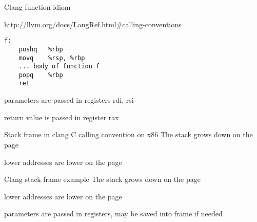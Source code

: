 \documentclass[landscape]{beamer}
\begin{document}
\begin{frame}[fragile]{Clang function idiom}

\url{http://llvm.org/docs/LangRef.html#calling-conventions}

\begin{verbatim}
f:
	pushq	%rbp
	movq	%rsp, %rbp
    ... body of function f
	popq	%rbp
	ret
\end{verbatim}

parameters are passed in registers rdi, rsi

return value is passed in register rax
\end{frame}


\begin{frame}[fragile]{Stack frame in clang C calling convention on x86}
The stack grows down on the page

lower addresses are lower on the page

  
\end{frame} 


\begin{frame}[fragile]{Clang stack frame example}
The stack grows down on the page

lower addresses are lower on the page

parameters are passed in registers, may be saved into frame if needed

  
\end{frame} 
\end{document}
